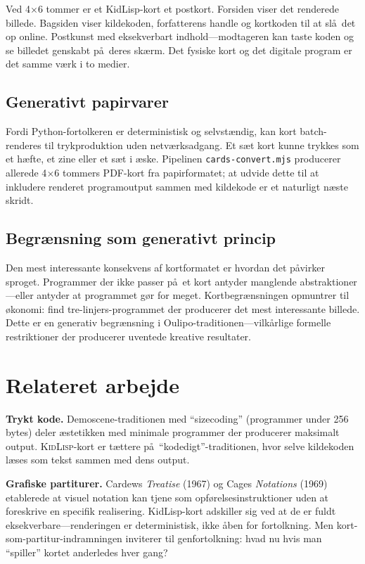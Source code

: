 \documentclass[10pt,letterpaper,twocolumn]{article}
\newcommand{\kidlisp}{\textsc{KidLisp}}
\begin{document}
Ved 4$\times$6 tommer er et KidLisp-kort et postkort. Forsiden viser det renderede billede. Bagsiden viser kildekoden, forfatterens handle og kortkoden til at sl\aa\ det op online. Postkunst med eksekverbart indhold---modtageren kan taste koden og se billedet genskabt p\aa\ deres sk\ae rm. Det fysiske kort og det digitale program er det samme v\ae rk i to medier.

\subsection{Generativt papirvarer}

Fordi Python-fortolkeren er deterministisk og selvst\ae ndig, kan kort batch-renderes til trykproduktion uden netv\ae rksadgang. Et s\ae t kort kunne trykkes som et h\ae fte, et zine eller et s\ae t i \ae ske. Pipelinen \texttt{cards-convert.mjs} producerer allerede 4$\times$6 tommers PDF-kort fra papirformatet; at udvide dette til at inkludere renderet programoutput sammen med kildekode er et naturligt n\ae ste skridt.

\subsection{Begr\ae nsning som generativt princip}

Den mest interessante konsekvens af kortformatet er hvordan det p\aa virker sproget. Programmer der ikke passer p\aa\ et kort antyder manglende abstraktioner---eller antyder at programmet g\o r for meget. Kortbegr\ae nsningen opmuntrer til \o konomi: find tre-linjers-programmet der producerer det mest interessante billede. Dette er en generativ begr\ae nsning i Oulipo-traditionen---vilk\aa rlige formelle restriktioner der producerer uventede kreative resultater.


\section{Relateret arbejde}

\textbf{Trykt kode.} Demoscene-traditionen med ``sizecoding'' (programmer under 256 bytes) deler \ae stetikken med minimale programmer der producerer maksimalt output. \kidlisp{}-kort er t\ae ttere p\aa\ ``kodedigt''-traditionen, hvor selve kildekoden l\ae ses som tekst sammen med dens output.

\textbf{Grafiske partiturer.} Cardews \emph{Treatise} (1967) og Cages \emph{Notations} (1969) etablerede at visuel notation kan tjene som opf\o relsesinstruktioner uden at foreskrive en specifik realisering. KidLisp-kort adskiller sig ved at de er fuldt eksekverbare---renderingen er deterministisk, ikke \aa ben for fortolkning. Men kort-som-partitur-indramningen inviterer til genfortolkning: hvad nu hvis man ``spiller'' kortet anderledes hver gang?
\end{document}
